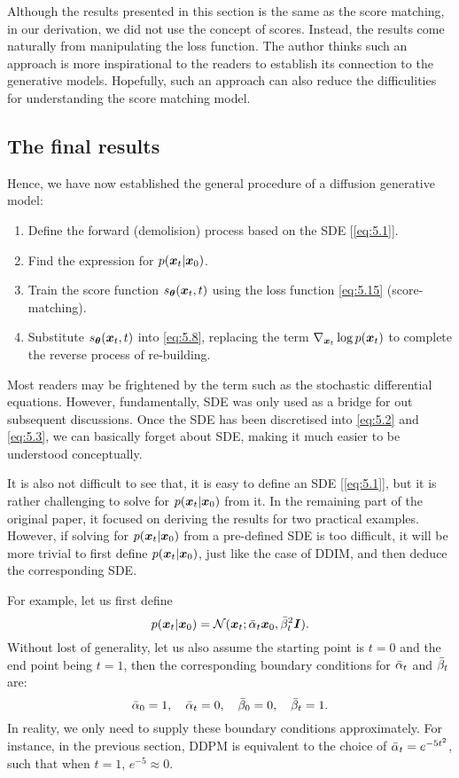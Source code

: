 Although the results presented in this section is the same as the score matching, in our derivation, we did not use the concept of scores. Instead, the results come naturally from manipulating the loss function. The author thinks such an approach is more inspirational to the readers to establish its connection to the generative models. Hopefully, such an approach can also reduce the difficulities for understanding the score matching model.

\subsection{The final results}
Hence, we have now established the general procedure of a diffusion generative model:
\begin{myquote}
\begin{enumerate}
    \item Define the forward (demolision) process based on the SDE [\cref{eq:5.1}].
    \item Find the expression for $p(\bm{x}_{t}|\bm{x}_0)$.
    \item Train the score function $s_{\bm{\theta}}(\bm{x}_{t},t)$ using the loss function \cref{eq:5.15} (score-matching).
    \item Substitute $s_{\bm{\theta}}(\bm{x}_{t},t)$ into \cref{eq:5.8}, replacing the term $\nabla_{\bm{x}_t}\log p(\bm{x}_t)$ to complete the reverse process of re-building.
\end{enumerate}
\end{myquote}

Most readers may be frightened by the term such as the stochastic differential equations. However, fundamentally, SDE was only used as a bridge for out subsequent discussions. Once the SDE has been discretised into \cref{eq:5.2} and \cref{eq:5.3}, we can basically forget about SDE, making it much easier to be understood conceptually.

It is also not difficult to see that, it is  easy to define an SDE [\cref{eq:5.1}], but it is rather challenging to solve for $p(\bm{x}_{t}|\bm{x}_0)$ from it. In the remaining part of the original paper\cite{song2020score}, it focused on deriving the results for two practical examples. However, if solving for $p(\bm{x}_{t}|\bm{x}_0)$ from a pre-defined SDE is too difficult, it will be more trivial to first define $p(\bm{x}_{t}|\bm{x}_0)$, just like the case of DDIM, and then deduce the corresponding SDE.

For example, let us first define
\begin{equation}
    \label{eq:5.16}
    p(\bm{x}_{t}|\bm{x}_0)=\mathcal{N}(\bm{x}_{t};\bar{\alpha}_t\bm{x}_0,\bar{\beta}_t^2\bm{I}).
\end{equation}
Without lost of generality, let us also assume the starting point is $t=0$ and the end point being $t=1$, then the corresponding boundary conditions for $\bar{\alpha}_t$ and $\bar{\beta}_t$ are:
\begin{equation}
    \label{eq:5.17}
    \bar{\alpha}_0=1,\quad \bar{\alpha}_t=0,\quad \bar{\beta}_0=0,\quad\bar{\beta}_t=1.
\end{equation}
In reality, we only need to supply these boundary conditions approximately. For instance, in the previous section, DDPM is equivalent to the choice of $\bar{\alpha}_t=e^{-5t^2}$, such that when $t=1$, $e^{-5}\approx0$.

